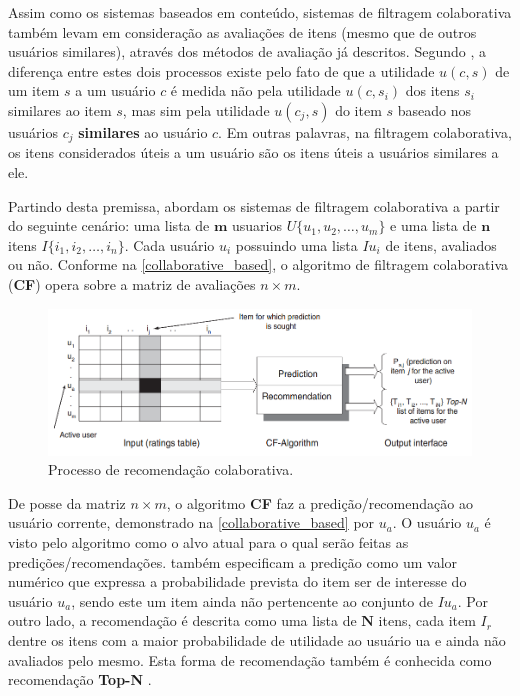 \documentclass[12pt, openright, oneside, a4paper, brazil]{abntex2}
\begin{document}
Assim como os sistemas baseados em conteúdo, sistemas de filtragem colaborativa também levam em consideração as avaliações de itens (mesmo que de outros usuários similares), através dos métodos de avaliação já descritos. Segundo , a diferença entre estes dois processos existe pelo fato de que a utilidade $u(c,s)$ de um item $s$ a um usuário $c$ é medida não pela utilidade $u(c,s_{i})$ dos itens $s_{i}$ similares ao item $s$, mas sim pela utilidade $u(c_{j}, s)$ do item $s$ baseado nos usuários $c_{j}$ \textbf{similares} ao usuário $c$. Em outras palavras, na filtragem colaborativa, os itens considerados úteis a um usuário são os itens úteis a usuários similares a ele.

Partindo desta premissa,  abordam os sistemas de filtragem colaborativa a partir do seguinte cenário: uma lista de $\textbf{m}$ usuarios $U \lbrace u_{1}, u_{2}, …, u_{m} \rbrace$ e uma lista de $\textbf{n}$ itens $I \lbrace i_{1}, i_{2}, …, i_{n} \rbrace$. Cada usuário $u_{i}$ possuindo uma lista $Iu_{i}$ de itens, avaliados ou não. Conforme na \autoref{collaborative_based}, o algoritmo de filtragem colaborativa (\textbf{CF}) opera sobre a matriz de avaliações $n \times m$.

\begin{figure}[htb]
	\caption{\label{collaborative_based}Processo de recomendação colaborativa.}

	\begin{center}
		\includegraphics[scale=0.6]{images/collaborative_based.png}
	\end{center}
\end{figure}

De posse da matriz $n \times m$, o algoritmo \textbf{CF} faz a predição/recomendação ao usuário corrente, demonstrado na \autoref{collaborative_based} por $u_{a}$. O usuário $u_{a}$ é visto pelo algoritmo como o alvo atual para o qual serão feitas as predições/recomendações.  também especificam a predição como um valor numérico que expressa a probabilidade prevista do item ser de interesse do usuário $u_{a}$, sendo este um item ainda não pertencente ao conjunto de $Iu_{a}$. Por outro lado, a recomendação é descrita como uma lista de $\textbf{N}$ itens, cada item $I_{r}$ dentre os itens com a maior probabilidade de utilidade ao usuário ua e ainda não avaliados pelo mesmo. Esta forma de recomendação também é conhecida como recomendação \textbf{Top-N} \cite{adomavicius2005toward}.
\end{document}
